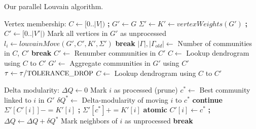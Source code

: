 \begin{algorithm}[hbtp]
\caption{Our parallel Louvain algorithm.}
\label{alg:louvain}
\begin{algorithmic}[1]
 \label{alg:louvain--main-begin}
  \State Vertex membership: $C \gets [0 .. |V|)$ \textbf{;} $G' \gets G$ \label{alg:louvain--initialization-begin}
  \ForAll{$l_p \in [0 .. \text{\small{MAX\_PASSES}})$} \label{alg:louvain--passes-begin}
    \State $\Sigma' \gets K' \gets vertexWeights(G')$ \textbf{;} $C' \gets [0 .. |V'|)$ \label{alg:louvain--reset-weights}
    \State Mark all vertices in $G'$ as unprocessed \label{alg:louvain--reset-affected}
    \State $l_i \gets louvainMove(G', C', K', \Sigma')$ \label{alg:louvain--local-move}
     \textbf{break}  \label{alg:louvain--globally-converged}
    \EndIf
    \State $|\Gamma|, |\Gamma_{old}| \gets$ Number of communities in $C$, $C'$
     \textbf{break}  \label{alg:louvain--aggregation-tolerance}
    \EndIf
    \State $C' \gets$ Renumber communities in $C'$ \label{alg:louvain--renumber}
    \State $C \gets$ Lookup dendrogram using $C$ to $C'$ \label{alg:louvain--lookup}
    \State $G' \gets$ Aggregate communities in $G'$ using $C'$ \label{alg:louvain--aggregate}
    \State $\tau \gets \tau / \text{\small{TOLERANCE\_DROP}}$  \label{alg:louvain--threshold-scaling}
  \EndFor \label{alg:louvain--passes-end}
  \State $C \gets$ Lookup dendrogram using $C$ to $C'$ \label{alg:louvain--lookup-last}
   \label{alg:louvain--main-return}
\EndFunction \label{alg:louvain--main-end}

\Statex

 \label{alg:louvain--move-begin}
  \ForAll{$l_i \in [0 .. \text{\small{MAX\_ITERATIONS}})$} \label{alg:louvain--iterations-begin}
    \State Delta modularity: $\Delta Q \gets 0$
      \State Mark $i$ as processed (prune) \label{alg:louvain--prune}
      \State $c^* \gets$ Best community linked to $i$ in $G'$ \label{alg:louvain--best-community-begin}
      \State $\delta Q^* \gets$ Delta-modularity of moving $i$ to $c^*$ \label{alg:louvain--best-community-end}
       \textbf{continue} \label{alg:louvain--best-community-same}
      \EndIf
      \State $\Sigma'[C'[i]] -= K'[i]$ \textbf{;} $\Sigma'[c^*] += K'[i]$ \textbf{atomic} \label{alg:louvain--perform-move-begin}
      \State $C'[i] \gets c^*$ \textbf{;} $\Delta Q \gets \Delta Q + \delta Q^*$ \label{alg:louvain--perform-move-end}
      \State Mark neighbors of $i$ as unprocessed \label{alg:louvain--remark}
    \EndFor \label{alg:louvain--iterations-end}
     \textbf{break}  \label{alg:louvain--locally-converged}
    \EndIf
  \EndFor
\EndFunction \label{alg:louvain--move-end}


\end{algorithmic}
\end{algorithm}
